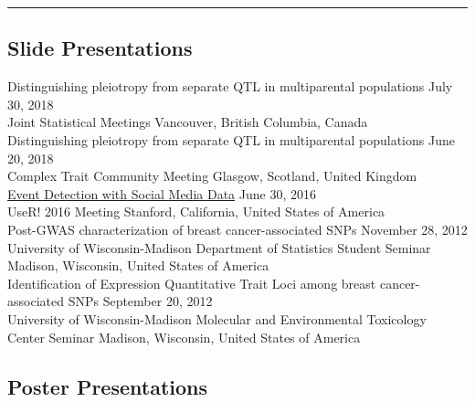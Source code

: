 \documentclass[
  10pt,
]
{article}
\begin{document}
\hrule

\subsection{Slide Presentations}\label{slide-presentations}

\normalsize Distinguishing pleiotropy from separate QTL in multiparental
populations \hfill July 30, 2018\\
Joint Statistical Meetings \hfill Vancouver, British Columbia, Canada\\
\normalsize Distinguishing pleiotropy from separate QTL in multiparental
populations \hfill June 20, 2018\\
Complex Trait Community Meeting \hfill Glasgow, Scotland, United
Kingdom\\
\normalsize \href{https://figshare.com/articles/Event_Detection_with_Social_Media_Data/3545477}{Event
Detection with Social Media Data} \hfill June 30, 2016\\
UseR! 2016 Meeting \hfill Stanford, California, United States of
America\\
\normalsize Post-GWAS characterization of breast cancer-associated SNPs
\hfill November 28, 2012\\
University of Wisconsin-Madison Department of Statistics Student Seminar
\hfill Madison, Wisconsin, United States of America\\
\normalsize Identification of Expression Quantitative Trait Loci among
breast cancer-associated SNPs \hfill September 20, 2012\\
University of Wisconsin-Madison Molecular and Environmental Toxicology
Center Seminar \hfill Madison, Wisconsin, United States of America

\subsection{Poster Presentations}\label{poster-presentations}
\end{document}

